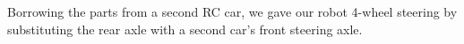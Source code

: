 \documentclass[12pt]{article}
\begin{document}
Borrowing the parts from a second RC car, we gave our robot 4-wheel steering by substituting the rear axle with a second car's front steering axle.
\begin{figure}[h]
\centering
{}
\hspace{5mm}
\end{figure}
\end{document}
